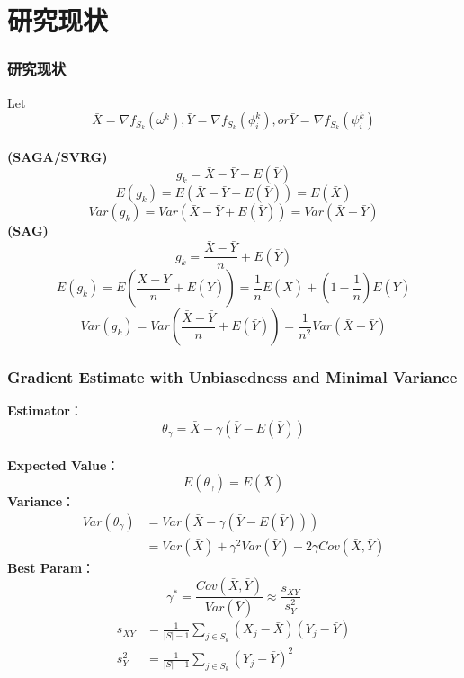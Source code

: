 \documentclass{beamer}
\begin{document}
\section{研究现状}

\begin{frame}
	\frametitle{\bf 研究现状} 
    Let $$\bar{X} = \nabla f_{S_k}(\omega^k), \bar{Y} = \nabla f_{S_k}(\phi_i^k), or \bar{Y} = \nabla f_{S_k}(\psi_i^k)$$\\
   \textbf { (SAGA/SVRG)}
    $$g_k =\bar{X}-\bar{Y}+E(\bar{Y}) $$
    $$E(g_k) = E(\bar{X}-\bar{Y}+E(\bar{Y})) = E(\bar{X})$$
    $$Var(g_k) = Var(\bar{X}-\bar{Y}+E(\bar{Y}))=Var(\bar{X}-\bar{Y})$$
    \textbf { (SAG)}
    $$g_k = \frac{\bar{X}-\bar{Y}}{n}+E(\bar{Y}) $$
	$$E(g_k) = E(\frac{\bar{X}-Y}{n}+E(\bar{Y})) = \frac{1}{n}E(\bar{X})+(1-\frac{1}{n})E(\bar{Y})$$
	$$Var(g_k) = Var(\frac{\bar{X}-\bar{Y}}{n}+E(\bar{Y}))= \frac{1}{n^2} Var(\bar{X}-\bar{Y})$$
\end{frame}

\begin{frame}
	\frametitle{\bf Gradient Estimate with Unbiasedness and Minimal Variance} 
	\textbf { Estimator}：$$\theta_{\gamma}=\bar{X}-\gamma(\bar{Y}-E(\bar{Y}))$$ \\
	\textbf { Expected Value}：$$E(\theta_{\gamma})=E(\bar{X})$$
	\textbf { Variance}：\begin{equation}
		\begin{aligned}
			Var(\theta_{\gamma}) & =Var(\bar{X}-\gamma(\bar{Y}-E(\bar{Y})))\\
			& =Var(\bar{X})+\gamma^2 Var(\bar{Y})-2 \gamma Cov(\bar{X},\bar{Y})
			\label{2:variance}
		\end{aligned}
	\end{equation}
	\textbf { Best Param}：
\begin{equation}
		\gamma^*=\frac{Cov(\bar{X}, \bar{Y})}{Var(\bar{Y})}\approx \frac{s_{XY}}{s_Y^2}
			\label{3:gamma_star}
\end{equation}
\begin{equation}
	\begin{aligned}
		s_{XY}&=\frac{1}{|S|-1}\sum_{j\in S_k}(X_j-\bar{X})(Y_j-\bar{Y})\\
		s_{Y}^2&=\frac{1}{|S|-1}\sum_{j\in S_k}(Y_j-\bar{Y})^2
		\label{2:sample_variance_1}
	\end{aligned}
\end{equation}

\end{frame}
\end{document}
